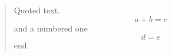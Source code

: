 \documentclass[10pt]{article}
\begin{document}
\begin{quote}
Quoted text.
\[ a + b = c \]
and a numbered one
\begin{equation} d = e \end{equation}
end.
\end{quote}
\end{document}
